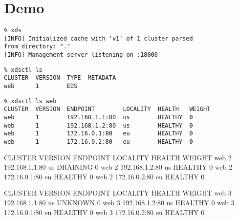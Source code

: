 \documentclass[aspectratio=169]{beamer}
\begin{document}
    \section{Demo}
    \begin{frame}[fragile]
        \begin{verbatim}
% xds
[INFO] Initialized cache with 'v1' of 1 cluster parsed
from directory: "."
[INFO] Management server listening on :18000
        \end{verbatim}

        \begin{verbatim}
% xdsctl ls
CLUSTER  VERSION  TYPE  METADATA
web      1        EDS
        \end{verbatim}
    \end{frame}

    \begin{frame}[fragile]
        \begin{verbatim}
% xdsctl ls web
CLUSTER  VERSION  ENDPOINT        LOCALITY  HEALTH   WEIGHT
web      1        192.168.1.1:80  us        HEALTHY  0
web      1        192.168.1.2:80  us        HEALTHY  0
web      1        172.16.0.1:80   eu        HEALTHY  0
web      1        172.16.0.2:80   eu        HEALTHY  0
        \end{verbatim}

    \end{frame}

    \begin{frame}[fragile]

        \begin{verbbox}
CLUSTER  VERSION  ENDPOINT        LOCALITY  HEALTH    WEIGHT
web      2        192.168.1.1:80  us        DRAINING  0
web      2        192.168.1.2:80  us        HEALTHY   0
web      2        172.16.0.1:80   eu        HEALTHY   0
web      2        172.16.0.2:80   eu        HEALTHY   0
        \end{verbbox}

    \end{frame}

    \begin{frame}[fragile]

        \begin{verbbox}
CLUSTER  VERSION  ENDPOINT        LOCALITY  HEALTH   WEIGHT
web      3        192.168.1.1:80  us        UNKNOWN  0
web      3        192.168.1.2:80  us        HEALTHY  0
web      3        172.16.0.1:80   eu        HEALTHY  0
web      3        172.16.0.2:80   eu        HEALTHY  0
        \end{verbbox}

    \end{frame}
\end{document}

